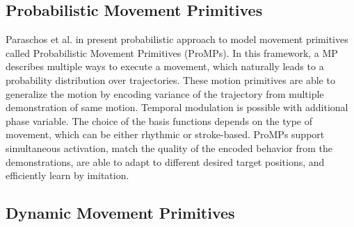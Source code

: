 \subsection{Probabilistic Movement Primitives}

Paraschos et al. in \cite{paraschos2013probabilistic} present probabilistic approach to model movement primitives called Probabilistic Movement Primitives (ProMPs). In this framework, a MP describes multiple ways to execute a movement, which naturally leads to a probability distribution over trajectories. These motion primitives are able to generalize the motion by encoding variance of the trajectory from multiple demonstration of same motion. Temporal modulation is possible with additional phase variable. The choice of the basis functions depends on the type of movement, which can be either rhythmic or stroke-based. ProMPs support simultaneous activation, match the quality of the encoded behavior from the demonstrations, are able to adapt to different desired target positions, and efficiently learn by imitation. 



\subsection{Dynamic Movement Primitives}

